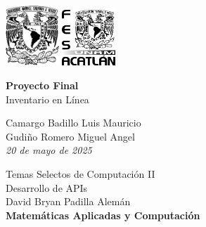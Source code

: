 \begin{titlepage}
    \begin{center}
        \includegraphics[width=0.15\textwidth]{auxiliary/assets/unam.png}
        \hspace{0.6\textwidth}
        \includegraphics[width=0.15\textwidth]{auxiliary/assets/fes.png}

        \vspace*{5cm}
        \LARGE
        \textbf{Proyecto Final}\\
        Inventario en Línea

        \vspace{1cm}
        \large
        Camargo Badillo Luis Mauricio \\
        Gudiño Romero Miguel Angel \\
        \vspace{1.5cm}
        \textit{20 de mayo de 2025}

        \vfill

        \vspace{0.5cm}
        Temas Selectos de Computación II \\
        Desarrollo de APIs \\
        \vspace{0.25cm}
        David Bryan Padilla Alemán \\
        \vspace{0.25cm}
        \textbf{Matemáticas Aplicadas y Computación}\\
    \end{center}
\end{titlepage}
